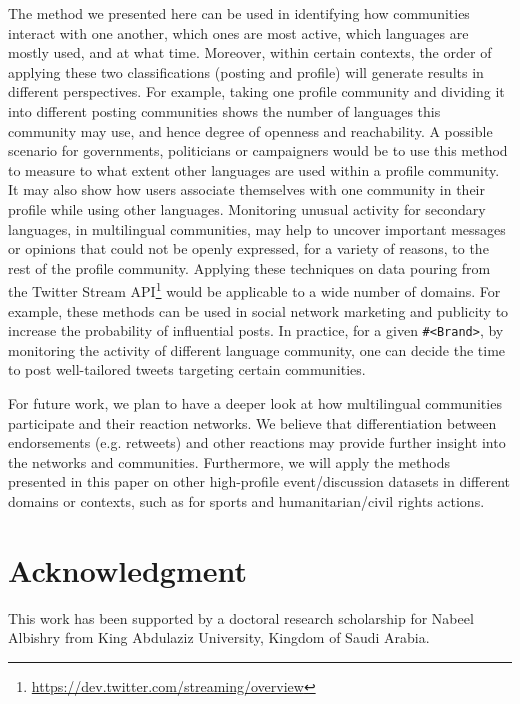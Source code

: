 \documentclass[conference]{IEEEtran}
\begin{document}
The method we presented here can be used in identifying how
communities interact with one another, which ones are most active,
which languages are mostly used, and at what time. Moreover, within
certain contexts, the order of applying these two classifications
(posting and profile) will generate results in different
perspectives. For example, taking one profile community and dividing
it into different posting communities shows the number of languages
this community may use, and hence degree of openness and
reachability. A possible scenario for governments, politicians or
campaigners would be to use this method to measure to what extent
other languages are used within a profile community. It may also show
how users associate themselves with one community in their profile
while using other languages. Monitoring unusual activity for secondary
languages, in multilingual communities, may help to uncover important
messages or opinions that could not be openly expressed, for a variety
of reasons, to the rest of the profile community. Applying these
techniques on data pouring from the Twitter Stream
API\footnote{\url{https://dev.twitter.com/streaming/overview}} would
be applicable to a wide number of domains. For example, these methods
can be used in social network marketing and publicity to increase the
probability of influential posts. In practice, for a given
{\texttt{\#<Brand>}}, by monitoring the activity of different language
community, one can decide the time to post well-tailored tweets
targeting certain communities.

For future work, we plan to have a deeper look at how multilingual
communities participate and their reaction networks. We believe that
differentiation between endorsements (e.g. retweets) and other
reactions may provide further insight into the networks and
communities. Furthermore, we will apply the methods presented in this
paper on other high-profile event/discussion datasets in different
domains or contexts, such as for sports and humanitarian/civil rights
actions.


\section*{Acknowledgment}

This work has been supported by a doctoral research scholarship for
Nabeel Albishry from King Abdulaziz University, Kingdom of Saudi
Arabia.







\end{document}
